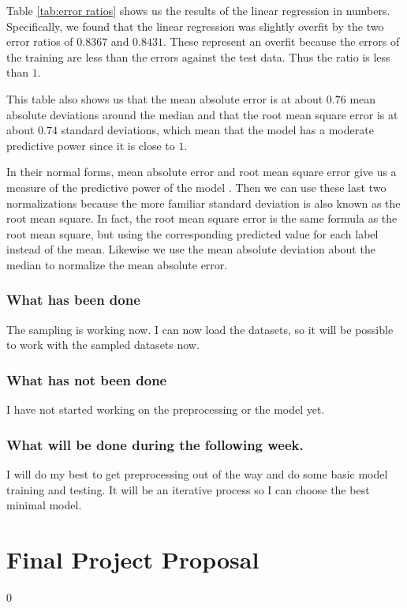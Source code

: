 \documentclass[11pt]{report}
\let\oldpart\part%
\renewcommand*\part[1]{\oldpart{#1}\setcounter{section}0}%
\begin{document}
Table \ref{tab:error ratios} shows us the results of the linear regression in numbers.
Specifically,
we found that the linear regression was slightly overfit by the two error ratios of \(\num{0.8367}\) and \(\num{0.8431}\).
These represent an overfit because the errors of the training are less than the errors against the test data.
Thus the ratio is less than \(1\).

This table also shows us that the mean absolute error is at about \(0.76\) mean absolute deviations around the median
and that the root mean square error is at about \(0.74\) standard deviations,
which mean that the model has a moderate predictive power since it is close to \(1\).

In their normal forms, mean absolute error and root mean square error give us a measure of the predictive power of the model \cite{rms2016}.
Then
we can use these last two normalizations because the more familiar standard deviation is also known as the root mean square.
In fact, the root mean square error is the same formula as the root mean square,
but using the corresponding predicted value for each label instead of the mean.
Likewise we use the mean absolute deviation about the median to normalize the mean absolute error.


\section{What has been done}

The sampling is working now.
I can now load the datasets,
so it will be possible to work with the sampled datasets now.

\section{What has not been done}

I have not started working on the preprocessing or the model yet.

\section{What will be done during the following week.}

I will do my best to get preprocessing out of the way and do some basic model training and testing.
It will be an iterative process
so I can choose the best minimal model.

\part{Final Project Proposal}
\end{document}
